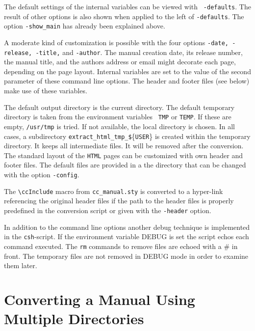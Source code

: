 \documentclass[12pt]{article}
\makeatletter
\newcommand{\TTindex}[1]{\index{#1@{\tt #1}}}
\makeatother
\begin{document}
\TTindex{TMP}\TTindex{TEMP} 

The default settings of the internal variables can be viewed with {\tt
  -defaults}. The result of other options is also shown when applied
to the left of {\tt -defaults}. The option {\tt -show\_main} has
already been explained above.

A moderate kind of customization is possible with the four options
{\tt -date, -release, -title,} and {\tt -author}. The manual creation
date, its release number, the manual title, and the authors address or
email might decorate each page, depending on the page layout.
Internal variables are set to the value of the second parameter of
these command line options.  The header and footer files (see below)
make use of these variables.

The default output directory is the current directory.  The default
temporary directory is taken from the environment variables {\tt
  TMP} or {\tt TEMP}. If these are empty, {\tt /usr/tmp} is tried. If
not available, the local directory is chosen. In all cases, a
subdirectory {\tt extract\_html\_tmp\_\$}\{{\tt USER}\} is created within
the temporary directory.  It keeps all intermediate files. It will be
removed after the conversion.  The standard layout of the {\tt HTML}
pages can be customized with own header and footer files. The default
files are provided in a the directory that can be changed with the
option {\tt -config}.

The \verb+\ccInclude+ macro from {\tt cc\_manual.sty} is converted to a
hyper-link referencing the original header files if the path to the
header files is properly predefined in the conversion script or given
with the {\tt -header} option.

\TTindex{DEBUG} 
In addition to the command line options another debug technique is
implemented in the {\tt csh}-script. If the environment variable DEBUG
is set the script echos each command executed. The {\tt rm} commands
to remove files are echoed with a \# in front. The temporary files are
not removed in DEBUG mode in order to examine them later.

\section{Converting a Manual Using Multiple Directories}
\label{sectionHtmlExtended}
\end{document}
